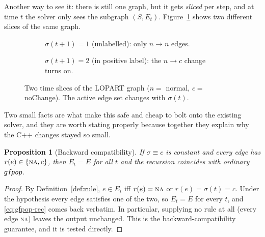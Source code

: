 \documentclass[11pt]{article}
\theoremstyle{definition}
\theoremstyle{plain}
\newtheorem{proposition}[definition]{Proposition}
\theoremstyle{remark}
\newcommand{\Rmap}{\sigma}
\begin{document}
Another way to see it: there is still one graph, but it gets \emph{sliced} per
step, and at time $t$ the solver only sees the subgraph $(S,E_t)$.
Figure~\ref{fig:timeexp} shows two different slices of the same graph.

\begin{figure}[h]
\centering
\begin{subfigure}{0.46\textwidth}\centering
{}
\caption{$\Rmap(t{+}1)=1$ (unlabelled): only $n\to n$ edges.}
\end{subfigure}\hspace{1.5em}
\begin{subfigure}{0.46\textwidth}\centering
{}
\caption{$\Rmap(t{+}1)=2$ (in positive label): the $n\to c$ change turns on.}
\end{subfigure}
\caption{Two time slices of the LOPART graph ($n=$ normal, $c=$ noChange). The
active edge set changes with $\Rmap(t)$.}
\label{fig:timeexp}
\end{figure}

Two small facts are what make this safe and cheap to bolt onto the existing
solver, and they are worth stating properly because together they explain why
the C++ changes stayed so small.

\begin{proposition}[Backward compatibility]\label{prop:bc}
If $\Rmap\equiv c$ is constant and every edge has $r(e)\in\{\textsc{na},c\}$,
then $E_t=E$ for all $t$ and the recursion coincides with ordinary
\texttt{gfpop}.
\end{proposition}
\begin{proof}
By Definition~\ref{def:rule}, $e\in E_t$ iff $r(e)=\textsc{na}$ or
$r(e)=\Rmap(t)=c$. Under the hypothesis every edge satisfies one of the two, so
$E_t=E$ for every $t$, and \eqref{eq:gfpop-rec} comes back verbatim. In
particular, supplying no rule at all (every edge \textsc{na}) leaves the output
unchanged. This is the backward-compatibility guarantee, and it is tested
directly.
\end{proof}
\end{document}
